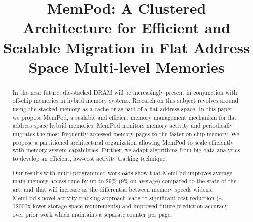 \documentclass{sig-alternate}
\title {MemPod: A Clustered Architecture for Efficient and Scalable Migration in Flat Address Space Multi-level Memories}
\author{}
\begin{document}
\maketitle
\thispagestyle{firstpage}
\pagestyle{plain}

\begin{abstract}

%

In the near future, die-stacked DRAM will be increasingly
present in conjunction with 
off-chip memories in hybrid memory systems. Research on this subject revolves around using the stacked memory as a cache or as part of a flat address space. In this paper we propose MemPod, a scalable and efficient memory management mechanism for flat address space hybrid memories. MemPod monitors memory activity and periodically migrates the most frequently accessed memory pages to the faster on-chip memory. We propose a partitioned architectural organization allowing MemPod to scale efficiently with memory system capabilities. Further, we adapt algorithms from big data analytics to develop an efficient, low-cost activity tracking technique. 

Our results with multi-programmed workloads show that MemPod improves average main memory access time by up to 29\% (9\% on average) compared to the state of the art, and that will increase as the differential between memory speeds
widens.
MemPod's novel activity tracking approach leads to significant cost reduction ($\sim$12000x lower storage space requirements) and improved future prediction accuracy over prior work which maintains a separate counter per page.

\end{abstract}
\end{document}
